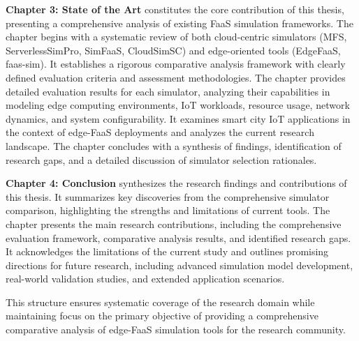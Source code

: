 \textbf{Chapter 3: State of the Art} constitutes the core contribution of this thesis, presenting a comprehensive analysis of existing FaaS simulation frameworks. The chapter begins with a systematic review of both cloud-centric simulators (MFS, ServerlessSimPro, SimFaaS, CloudSimSC) and edge-oriented tools (EdgeFaaS, faas-sim). It establishes a rigorous comparative analysis framework with clearly defined evaluation criteria and assessment methodologies. The chapter provides detailed evaluation results for each simulator, analyzing their capabilities in modeling edge computing environments, IoT workloads, resource usage, network dynamics, and system configurability. It examines smart city IoT applications in the context of edge-FaaS deployments and analyzes the current research landscape. The chapter concludes with a synthesis of findings, identification of research gaps, and a detailed discussion of simulator selection rationales.

\textbf{Chapter 4: Conclusion} synthesizes the research findings and contributions of this thesis. It summarizes key discoveries from the comprehensive simulator comparison, highlighting the strengths and limitations of current tools. The chapter presents the main research contributions, including the comprehensive evaluation framework, comparative analysis results, and identified research gaps. It acknowledges the limitations of the current study and outlines promising directions for future research, including advanced simulation model development, real-world validation studies, and extended application scenarios.

This structure ensures systematic coverage of the research domain while maintaining focus on the primary objective of providing a comprehensive comparative analysis of edge-FaaS simulation tools for the research community.